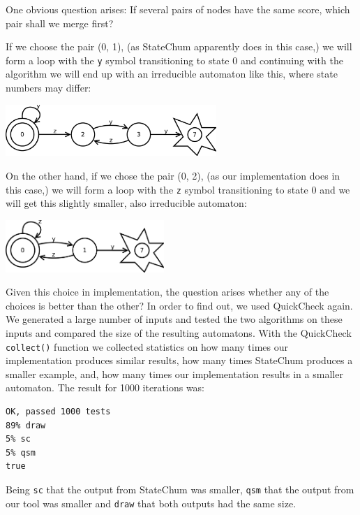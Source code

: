 \documentclass[]{sigplanconf}
\begin{document}
One obvious question arises: If several pairs of nodes have the same score,
which pair shall we merge first?

If we choose the pair (0, 1), (as StateChum apparently does in this case,) we will
form a loop with the \texttt{y} symbol transitioning to state 0 and continuing with
the algorithm we will end up with an irreducible automaton like this, where state 
numbers may differ:

\begin{center}
\includegraphics[width=8cm]{pictures/fsm6.pdf}
\end{center}
 
On the other hand, if we chose the pair (0, 2), (as our implementation does in this
case,) we will form a loop with the \texttt{z} symbol transitioning to state 0 and
we will get this slightly smaller, also irreducible automaton:

\begin{center}
\includegraphics[width=6cm]{pictures/fsm7.pdf}
\end{center}

Given this choice in implementation, the question arises whether any of the
choices is better than the other? In order to find out, we used QuickCheck again. 
We generated a large number of inputs
and tested the two algorithms on these inputs and compared the size of
the resulting automatons. With the QuickCheck \texttt{collect()} function we
collected statistics on how
many times our implementation produces similar results, how many times StateChum
produces a smaller example, and, how many
times our implementation results in a smaller automaton. The result for 1000
iterations was:

\begin{verbatim}
OK, passed 1000 tests
89% draw
5% sc
5% qsm
true
\end{verbatim}

Being \texttt{sc} that the output from StateChum was smaller, \texttt{qsm}
that the output from our tool was smaller and \texttt{draw} that both
outputs had the same size.
\end{document}
